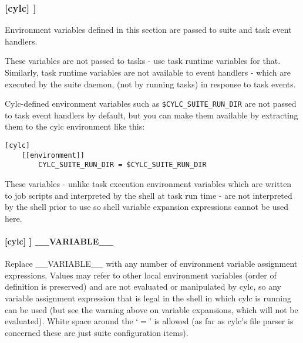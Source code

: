 \subsubsection[{[[}environment{]]} ]{[cylc] \textrightarrow [[environment]]}

Environment variables defined in this section are passed to suite and
task event handlers.

\begin{myitemize}
    \item These variables are not passed to tasks - use task runtime
        variables for that. Similarly, task runtime variables are not
        available to event handlers - which are executed by the suite daemon,
        (not by running tasks) in response to task events.

    \item Cylc-defined environment variables such as
        \lstinline=$CYLC_SUITE_RUN_DIR= are not passed to task event
        handlers by default, but you can make them available by
        extracting them to the cylc environment like this:
\begin{lstlisting}
[cylc]
    [[environment]]
        CYLC_SUITE_RUN_DIR = $CYLC_SUITE_RUN_DIR
\end{lstlisting}

    \item These variables - unlike task execution environment variables
        which are written to job scripts and interpreted by the shell at
        task run time - are not interpreted by the shell prior to use
        so shell variable expansion expressions cannot be used here.
\end{myitemize}

\paragraph[\_\_VARIABLE\_\_ ]{[cylc] \textrightarrow [[environment]] \textrightarrow \_\_VARIABLE\_\_}

Replace \_\_VARIABLE\_\_ with any number of environment variable
assignment expressions.
Values may refer to other local environment variables (order of
definition is preserved) and are not evaluated or manipulated by
cylc, so any variable assignment expression that is legal in the
shell in which cylc is running can be used (but see the warning
above on variable expansions, which will not be evaluated).
White space around the `$=$' is allowed (as far as cylc's file
parser is concerned these are just suite configuration items).

